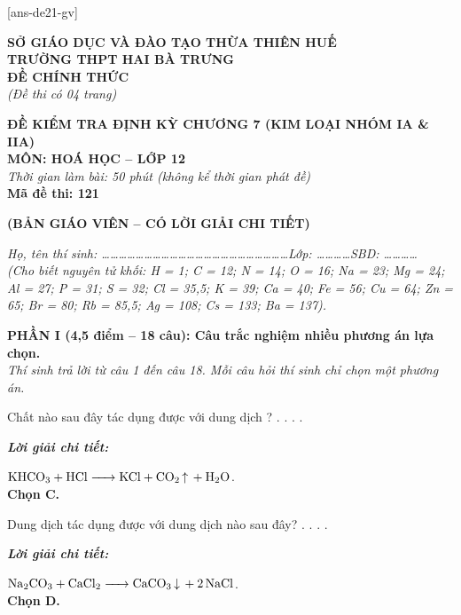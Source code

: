 \documentclass[11pt,a4paper]{article}
\def\loigiai#1{
\par\begingroup\color{blue!80!black}\small
\noindent\textbf{\textit{Lời giải chi tiết:}}\par
#1\par\endgroup}
\begin{document}
[ans-de21-gv]

\noindent
\begin{minipage}[t]{0.48\textwidth}
	\textbf{SỞ GIÁO DỤC VÀ ĐÀO TẠO THỪA THIÊN HUẾ}\\
	\textbf{TRƯỜNG THPT HAI BÀ TRƯNG}\\
	\textbf{ĐỀ CHÍNH THỨC}\\
	\textit{(Đề thi có 04 trang)}
\end{minipage}\hfill
\begin{minipage}[t]{0.48\textwidth}
	\raggedleft
	\textbf{\color{mainGreen}ĐỀ KIỂM TRA ĐỊNH KỲ CHƯƠNG 7 (KIM LOẠI NHÓM IA \& IIA)}\\
	\textbf{MÔN: HOÁ HỌC -- LỚP 12}\\
	\textit{Thời gian làm bài: 50 phút (không kể thời gian phát đề)}\\
	\textbf{Mã đề thi: 121}
\end{minipage}


\vspace{0.1cm}
\begin{center}
	\textbf{\color{hfRed}\Large (BẢN GIÁO VIÊN -- CÓ LỜI GIẢI CHI TIẾT)}
\end{center}

\vspace{1pt}
\noindent\textit{Họ, tên thí sinh: \dots\dots\dots\dots\dots\dots\dots\dots\dots\dots\dots\dots\dots\dots\dots\dots\dots\dots\dots\dots\dots\dots Lớp: \dots\dots\dots\dots SBD: \dots\dots\dots\dots}\\
\noindent\textit{(Cho biết nguyên tử khối: H = 1; C = 12; N = 14; O = 16; Na = 23; Mg = 24; Al = 27; P = 31; S = 32; Cl = 35,5; K = 39; Ca = 40; Fe = 56; Cu = 64; Zn = 65; Br = 80; Rb = 85,5; Ag = 108; Cs = 133; Ba = 137).}

\vspace{1pt}
\noindent
\textbf{PHẦN I (4,5 điểm -- 18 câu): Câu trắc nghiệm nhiều phương án lựa chọn.}\\
\textit{Thí sinh trả lời từ câu 1 đến câu 18. Mỗi câu hỏi thí sinh chỉ chọn một phương án.}

\begin{ex}
Chất nào sau đây tác dụng được với dung dịch ?
\choice
{.}
{.}
{\True {}.}
{.}
\loigiai{
$\ce{KHCO3 + HCl -> KCl + CO2 ^ + H2O}$.\\
\textbf{Chọn C.}}
\end{ex}

\begin{ex}
Dung dịch  tác dụng được với dung dịch nào sau đây?
\choice
{.}
{.}
{.}
{\True {}.}
\loigiai{
$\ce{Na2CO3 + CaCl2 -> CaCO3 v + 2NaCl}$.\\
\textbf{Chọn D.}}
\end{ex}
\end{document}
